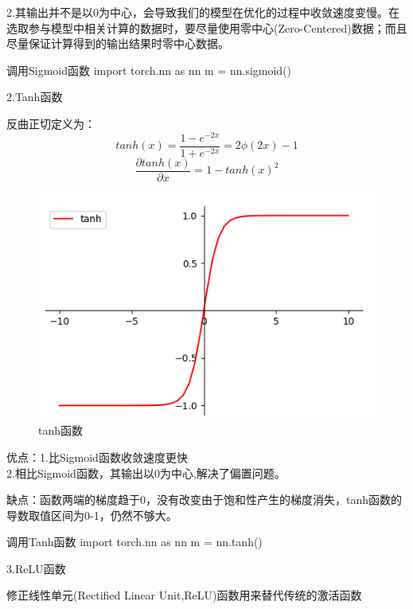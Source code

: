 \documentclass[openbib]{article}
\begin{document}
2.其输出并不是以0为中心，会导致我们的模型在优化的过程中收敛速度变慢。在选取参与模型中相关计算的数据时，要尽量使用零中心(Zero-Centered)数据；而且尽量保证计算得到的输出结果时零中心数据。

\begin{Python}{调用Sigmoid函数}
import torch.nn as nn
m = nn.sigmoid()
\end{Python}

\begin{center}
	2.Tanh函数
\end{center}
反曲正切定义为：
$$tanh(x)=\frac{1-e^{-2x}}{1+e^{-2x}}=2\phi(2x)-1$$
$$\frac{\partial tanh(x)}{\partial x}=1-tanh(x)^2$$
\begin{figure}[htbp]
	\centering
	\includegraphics[scale=0.38]{tanh.jpg}
	\caption{tanh函数}
\end{figure}

优点：1.比Sigmoid函数收敛速度更快\\
2.相比Sigmoid函数，其输出以0为中心,解决了偏置问题。

缺点：函数两端的梯度趋于0，没有改变由于饱和性产生的梯度消失，tanh函数的导数取值区间为0-1，仍然不够大。

\begin{Python}{调用Tanh函数}
import torch.nn as nn
m = nn.tanh()
\end{Python}

\begin{center}
	3.ReLU函数
\end{center}
修正线性单元(Rectified Linear Unit,ReLU)函数用来替代传统的激活函数
\end{document}
